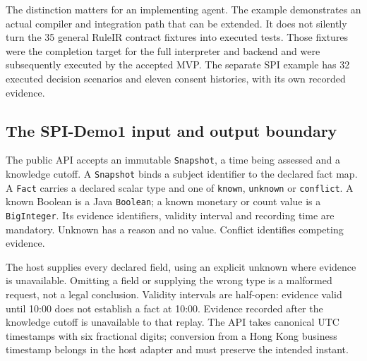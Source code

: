 
The distinction matters for an implementing agent. The example demonstrates an
actual compiler and integration path that can be extended. It does not silently
turn the 35 general RuleIR contract fixtures into executed tests. Those fixtures were the completion target for the full interpreter and
backend and were subsequently executed by the accepted MVP. The separate
SPI example has 32 executed decision scenarios and eleven consent histories, with
its own recorded evidence.

\subsection{The SPI-Demo1 input and output boundary}
\label{merge:P-03d-java-delivery:02}


The public API accepts an immutable \texttt{Snapshot}, a time being assessed and
a knowledge cutoff. A \texttt{Snapshot} binds a subject identifier to the
declared fact map. A \texttt{Fact} carries a declared scalar type and one of
\texttt{known}, \texttt{unknown} or \texttt{conflict}. A known Boolean is a Java
\texttt{Boolean}; a known monetary or count value is a \texttt{BigInteger}.
Its evidence identifiers, validity interval and recording time are mandatory.
Unknown has a reason and no value. Conflict identifies competing evidence.

The host supplies every declared field, using an explicit unknown where evidence
is unavailable. Omitting a field or supplying the wrong type is a malformed
request, not a legal conclusion. Validity intervals are half-open: evidence
valid until 10:00 does not establish a fact at 10:00. Evidence recorded after
the knowledge cutoff is unavailable to that replay. The API takes canonical UTC
timestamps with six fractional digits; conversion from a Hong Kong business
timestamp belongs in the host adapter and must preserve the intended instant.

